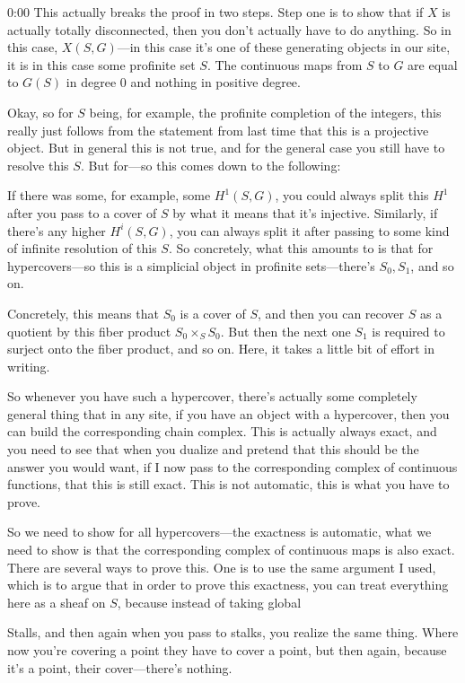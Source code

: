 \begin{unfinished}{0:00}
This actually breaks the proof in two steps. Step one is to show that if $X$ is actually totally disconnected, then you don't actually have to do anything. So in this case, $X(S, G)$---in this case it's one of these generating objects in our site, it is in this case some profinite set $S$. The continuous maps from $S$ to $G$ are equal to $G(S)$ in degree $0$ and nothing in positive degree.

Okay, so for $S$ being, for example, the profinite completion of the integers, this really just follows from the statement from last time that this is a projective object. But in general this is not true, and for the general case you still have to resolve this $S$. But for---so this comes down to the following:

If there was some, for example, some $H^1(S, G)$, you could always split this $H^1$ after you pass to a cover of $S$ by what it means that it's injective. Similarly, if there's any higher $H^i(S, G)$, you can always split it after passing to some kind of infinite resolution of this $S$. So concretely, what this amounts to is that for hypercovers---so this is a simplicial object in profinite sets---there's $S_0, S_1$, and so on.

Concretely, this means that $S_0$ is a cover of $S$, and then you can recover $S$ as a quotient by this fiber product $S_0 \times_S S_0$. But then the next one $S_1$ is required to surject onto the fiber product, and so on. Here, it takes a little bit of effort in writing.

So whenever you have such a hypercover, there's actually some completely general thing that in any site, if you have an object with a hypercover, then you can build the corresponding chain complex. This is actually always exact, and you need to see that when you dualize and pretend that this should be the answer you would want, if I now pass to the corresponding complex of continuous functions, that this is still exact. This is not automatic, this is what you have to prove.

So we need to show for all hypercovers---the exactness is automatic, what we need to show is that the corresponding complex of continuous maps is also exact. There are several ways to prove this. One is to use the same argument I used, which is to argue that in order to prove this exactness, you can treat everything here as a sheaf on $S$, because instead of taking global

Stalls, and then again when you pass to stalks, you realize the same thing. Where now you're covering a point they have to cover a point, but then again, because it's a point, their cover---there's nothing.


\end{unfinished}
